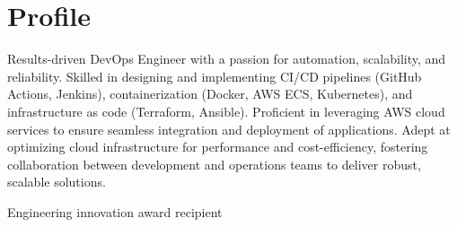 \documentclass[letterpaper]{tenseconds} %
\begin{document}
\makeprofile %

\section{Profile}
\textnormal{\faInfo} Results-driven DevOps Engineer with a passion for automation, scalability, and reliability. Skilled in designing and implementing CI/CD pipelines (GitHub Actions, Jenkins), containerization (Docker, AWS ECS, Kubernetes), and infrastructure as code (Terraform, Ansible). Proficient in leveraging AWS cloud services to ensure seamless integration and deployment of applications. Adept at optimizing cloud infrastructure for performance and cost-efficiency, fostering collaboration between development and operations teams to deliver robust, scalable solutions.


 
\textnormal{\textcolor{materialamber}{\faTrophy}} Engineering innovation award recipient

\end{document}
